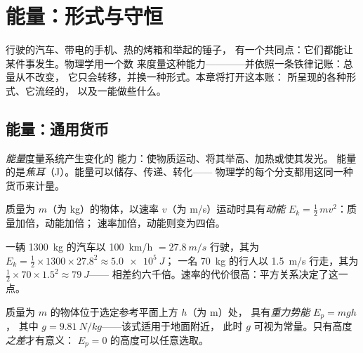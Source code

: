 \chapter{能量：形式与守恒}\label{ch:g10:energy-conservation}

行驶的汽车、带电的手机、热的烤箱和举起的锤子，
有一个共同点：它们都能让某件事发生。物理学用一个数
来度量这种能力————并依照一条铁律记账：总量从不改变，
它只会转移，并换一种形式。本章将打开这本账：
所呈现的各种形式、它流经的，
以及一能做些什么。

\section{能量：通用货币}

\begin{definition}[能量与焦耳]\label{def:g10:energy-conservation:energy}
\emph{能量}度量系统产生变化的
能力：使物质运动、将其举高、加热或使其发光。
能量的是\emph{焦耳}（\unit{J}）。能量可以储存、传递、转化——
物理学的每个分支都用这同一种货币来计量。
\end{definition}

\begin{definition}[动能]\label{def:g10:energy-conservation:kinetic}
质量为 $m$（为 \unit{kg}）的物体，以速率 $v$（为
\unit{m/s}）运动时具有\emph{动能}
$E_k = \tfrac12\, m v^2$：质量加倍，动能加倍；
速率加倍，动能则变为四倍。
\end{definition}

\begin{example}[汽车与行人]\label{ex:g10:energy-conservation:kinetic}
一辆 \qty{1300}{kg} 的汽车以 \qty{100}{km/h} $= \qty{27.8}{m/s}$ 行驶，其为
$E_k = \tfrac12 \times 1300 \times 27.8^2 \approx \qty{5.0e5}{J}$；
一名 \qty{70}{kg} 的行人以 \qty{1.5}{m/s} 行走，其为
$\tfrac12 \times 70 \times 1.5^2 \approx \qty{79}{J}$——
相差约六千倍。速率的代价很高：平方关系决定了这一点。
\end{example}

\begin{definition}[重力势能]\label{def:g10:energy-conservation:potential}
质量为 $m$ 的物体位于选定参考平面上方 $h$（为 \unit{m}）处，
具有\emph{重力势能}
$E_p = m g h$，
其中 $g = \qty{9.81}{N/kg}$——该式适用于地面附近，
此时 $g$ 可视为常量。只有高度\emph{之差}才有意义：
$E_p = 0$ 的高度可以任意选取。
\end{definition}


